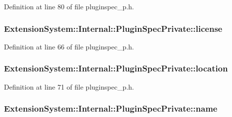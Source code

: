 Definition at line 80 of file pluginspec\-\_\-p.\-h.

\hypertarget{class_extension_system_1_1_internal_1_1_plugin_spec_private_a8060ccf842513091c9821ad6118a22c0}{
\subsubsection[{license}]{ Extension\-System\-::\-Internal\-::\-Plugin\-Spec\-Private\-::license}}\label{class_extension_system_1_1_internal_1_1_plugin_spec_private_a8060ccf842513091c9821ad6118a22c0}


Definition at line 66 of file pluginspec\-\_\-p.\-h.

\hypertarget{class_extension_system_1_1_internal_1_1_plugin_spec_private_a69f6532837e17c9858580b506b5c3448}{
\subsubsection[{location}]{ Extension\-System\-::\-Internal\-::\-Plugin\-Spec\-Private\-::location}}\label{class_extension_system_1_1_internal_1_1_plugin_spec_private_a69f6532837e17c9858580b506b5c3448}


Definition at line 71 of file pluginspec\-\_\-p.\-h.

\hypertarget{class_extension_system_1_1_internal_1_1_plugin_spec_private_ab3a82ed362b9755352316778bda2c635}{
\subsubsection[{name}]{ Extension\-System\-::\-Internal\-::\-Plugin\-Spec\-Private\-::name}}\label{class_extension_system_1_1_internal_1_1_plugin_spec_private_ab3a82ed362b9755352316778bda2c635}


